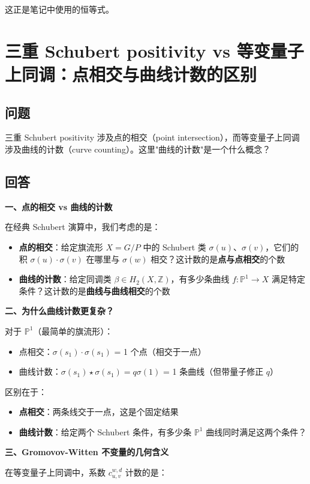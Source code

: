 这正是笔记中使用的恒等式。

\section{三重 Schubert positivity vs 等变量子上同调：点相交与曲线计数的区别}\label{sec:qa-curve-counting-vs-point-intersection}
\subsection{问题}
三重 Schubert positivity 涉及点的相交（point intersection），而等变量子上同调涉及曲线的计数（curve counting）。这里"曲线的计数"是一个什么概念？
\subsection{回答}
\textbf{一、点的相交 vs 曲线的计数}

在经典 Schubert 演算中，我们考虑的是：
\begin{itemize}
\item \textbf{点的相交}：给定旗流形 $X = G/P$ 中的 Schubert 类 $\sigma(u)$、$\sigma(v)$，它们的积 $\sigma(u) \cdot \sigma(v)$ 在哪里与 $\sigma(w)$ 相交？这计数的是\textbf{点与点相交}的个数
\item \textbf{曲线的计数}：给定同调类 $\beta \in H_2(X,\mathbb{Z})$，有多少条曲线 $f: \mathbb{P}^1 \to X$ 满足特定条件？这计数的是\textbf{曲线与曲线相交}的个数
\end{itemize}

\textbf{二、为什么曲线计数更复杂？}

对于 $\mathbb{P}^1$（最简单的旗流形）：
\begin{itemize}
\item 点相交：$\sigma(s_1) \cdot \sigma(s_1)$ = 1 个点（相交于一点）
\item 曲线计数：$\sigma(s_1) \star \sigma(s_1) = q \sigma(1)$ = 1 条曲线（但带量子修正 $q$）
\end{itemize}

区别在于：
\begin{itemize}
\item \textbf{点相交}：两条线交于一点，这是个固定结果
\item \textbf{曲线计数}：给定两个 Schubert 条件，有多少条 $\mathbb{P}^1$ 曲线同时满足这两个条件？
\end{itemize}

\textbf{三、Gromovov-Witten 不变量的几何含义}

在等变量子上同调中，系数 $c_{u,v}^{w,d}$ 计数的是：

